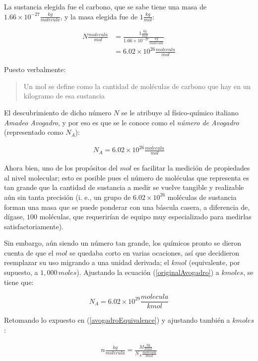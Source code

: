 \documentclass{article}
\begin{document}
La sustancia elegida fue el carbono, que se sabe tiene una masa de \(1.66\times10^{-27}\frac{kg}{molecula}\),
y la masa elegida fue de \(1\frac{kg}{mol}\):

\begin{align*}
    N\frac{molecula}{mol} & = \frac{1\frac{kg}{mol}}{1.66 \times 10^{-27}\frac{kg}{molecula}} \\
                          & = 6.02 \times 10^{26} \frac{molecula}{mol}
\end{align*}

Puesto verbalmente:

\begin{quote}
    Un mol se define como la cantidad de moléculas
    de carbono que hay en un kilogramo de esa sustancia
\end{quote}

El descubrimiento de dicho número \(N\) se le atribuye al físico-químico
italiano \textit{Amadeo Avogadro}, y por eso es que se le conoce
como el \textit{número de Avogadro} (representado como \(N_A\)):

\begin{align}
    N_A = 6.02 \times 10^{26} \frac{molecula}{mol} \label{originalAvogadro}
\end{align}

Ahora bien, uno de los propósitos del \(mol\) es facilitar
la medición de propiedades al nivel molecular; esto es
posible pues el número de moléculas que representa es tan grande
que la cantidad de sustancia a medir se vuelve tangible y
realizable aún sin tanta precisión (i. e., un grupo de
\(6.02 \times 10^{26}\) moléculas de sustancia forman una masa
que se puede ponderar con una báscula casera, a diferencia de, dígase,
\(100\) moléculas, que requerirían de equipo muy especializado
para medirlas satisfactoriamente).

Sin embargo, aún siendo un número tan grande, los químicos
pronto se dieron cuenta de que el \(mol\) se quedaba
corto en varias ocaciones, así que decidieron reemplazar su uso migrando
a una unidad derivada; el \(kmol\) (equivalente, por supuesto,
a \(1,000\,moles\)). Ajustando la ecuación (\ref{originalAvogadro}) a \(kmoles\),
se tiene que:

\[
    N_A = 6.02 \times 10^{29} \frac{molecula}{kmol}
\]

Retomando lo expuesto en (\ref{avogadroEquivalence}) y ajustando también a \(kmoles\):

\begin{align}
    n \frac{kg}{molecula} = \frac{M \frac{kg}{kmol}}{ N_A \frac{molecula}{kmol}}
\end{align}
\end{document}
